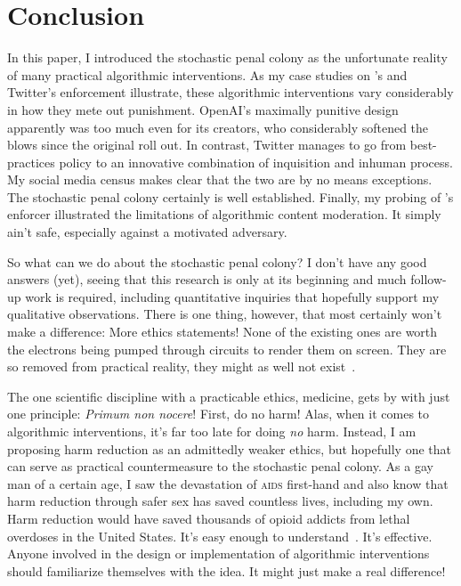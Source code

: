 \section{Conclusion}
\label{sec:conclusion}

In this paper, I introduced the stochastic penal colony as the unfortunate
reality of many practical algorithmic interventions. As my case studies on
\DALLE's and Twitter's enforcement illustrate, these algorithmic interventions
vary considerably in how they mete out punishment. OpenAI's maximally punitive
design apparently was too much even for its creators, who considerably softened
the blows since the original roll out. In contrast, Twitter manages to go from
best-practices policy to an innovative combination of inquisition and inhuman
process. My social media census makes clear that the two are by no means
exceptions. The stochastic penal colony certainly is well established. Finally,
my probing of \DALLE's enforcer illustrated the limitations of algorithmic
content moderation. It simply ain't safe, especially against a motivated
adversary.

So what can we do about the stochastic penal colony? I don't have any good
answers (yet), seeing that this research is only at its beginning and much
follow-up work is required, including quantitative inquiries that hopefully
support my qualitative observations. There is one thing, however, that most
certainly won't make a difference: More  ethics statements! None of the
existing ones are worth the electrons being pumped through circuits to render
them on screen. They are so removed from practical reality, they might as well
not exist~\cite{Hagendorff2022,Munn2022,WhittlestoneNyrupea2019}.

The one scientific discipline with a practicable ethics, medicine, gets by with
just one principle: \emph{Primum non nocere}! First, do no harm! Alas, when it
comes to algorithmic interventions, it's far too late for doing \emph{no} harm.
Instead, I am proposing harm reduction as an admittedly weaker  ethics, but
hopefully one that can serve as practical countermeasure to the stochastic penal
colony. As a gay man of a certain age, I saw the devastation of \textsc{aids}
first-hand and also know that harm reduction through safer sex has saved
countless lives, including my own. Harm reduction would have saved thousands of
opioid addicts from lethal overdoses in the United States. It's easy enough to
understand~\cite{HRI2020,HRI2022,Interlandi2023,MarlattLarimerea2011,OpenSocietyFoundations2021}.
It's effective. Anyone involved in the design or implementation of algorithmic
interventions should familiarize themselves with the idea. It might just make a
real difference!
